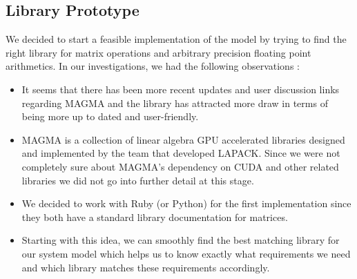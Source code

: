 \documentclass[11pt, letterpaper, oneside]{article}
\begin{document}
\subsection{ Library Prototype}

We decided to start a feasible implementation of the model by trying to find the right library
for matrix operations and arbitrary precision floating point arithmetics.
In our investigations, we had the following observations :

\begin{itemize}

\item It seems that there has been more recent updates and user discussion links regarding MAGMA
and the library has attracted more draw in terms of being more up to dated and user-friendly.
\item MAGMA is a collection of linear algebra GPU accelerated libraries designed and implemented
by the team that developed LAPACK.
Since we were not completely sure about MAGMA's dependency on CUDA and other related libraries we did not go into further detail at this stage.
\item We decided to work with Ruby (or Python) for the first implementation since they both have a
standard library documentation for matrices.
\item Starting with this idea, we can smoothly find the best matching library for our system
model which helps us to know exactly what requirements we need and which library matches these
requirements accordingly.
\end{itemize}




\end{document}
